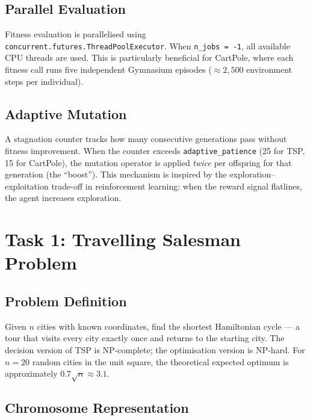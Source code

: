 \documentclass[12pt,a4paper]{article}
\begin{document}
\subsection{Parallel Evaluation}

Fitness evaluation is parallelised using \texttt{concurrent.futures.ThreadPoolExecutor}. When \texttt{n\_jobs~=~-1}, all available CPU threads are used. This is particularly beneficial for CartPole, where each fitness call runs five independent Gymnasium episodes ($\approx 2{,}500$ environment steps per individual).

\subsection{Adaptive Mutation}

A stagnation counter tracks how many consecutive generations pass without fitness improvement. When the counter exceeds \texttt{adaptive\_patience} (25 for TSP, 15 for CartPole), the mutation operator is applied \emph{twice} per offspring for that generation (the ``boost''). This mechanism is inspired by the exploration–exploitation trade-off in reinforcement learning: when the reward signal flatlines, the agent increases exploration.

\section{Task 1: Travelling Salesman Problem}
\label{sec:tsp}

\subsection{Problem Definition}

Given $n$ cities with known coordinates, find the shortest Hamiltonian cycle — a tour that visits every city exactly once and returns to the starting city. The decision version of TSP is NP-complete; the optimisation version is NP-hard. For $n = 20$ random cities in the unit square, the theoretical expected optimum is approximately $0.7\sqrt{n} \approx 3.1$.

\subsection{Chromosome Representation}
\end{document}
